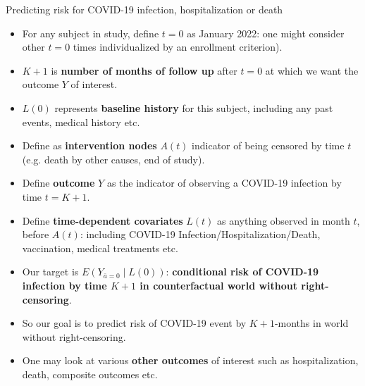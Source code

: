 \documentclass[t]{beamer}
\begin{document}
\begin{frame}{Predicting risk for COVID-19 infection, hospitalization or death}

\begin{itemize}
\item For any subject in study, define $t=0$ as January 2022: one might consider other $t=0$ times individualized by an enrollment criterion).
\item $K+1$ is {\bf number of months of follow up} after $t=0$ at which we want the outcome $Y$  of interest.
\item $L(0)$ represents {\bf baseline history} for this subject, including any past events, medical history etc.
\item Define as {\bf intervention nodes} $A(t)$ indicator of being censored by time $t$ (e.g. death by other causes, end of study).
\item Define {\bf outcome} $Y$ as the indicator of observing a COVID-19 infection by time  $t=K+1$.
\item Define {\bf time-dependent covariates} $L(t)$ as anything observed in month $t$, before $A(t)$: including COVID-19 Infection/Hospitalization/Death, vaccination, medical treatments etc.
\end{itemize}
\end{frame}
\begin{frame}
\begin{itemize}
\item Our target is $E(Y_{\bar{a}=0}\mid L(0))$: {\bf conditional risk of COVID-19 infection by time $K+1$ in counterfactual world without right-censoring}.
\item So our goal is to predict risk of COVID-19 event by $K+1$-months in world without right-censoring.
\item One  may look at various {\bf other outcomes} of interest such as hospitalization, death, composite outcomes etc.
\end{itemize}
\end{frame}
\end{document}
